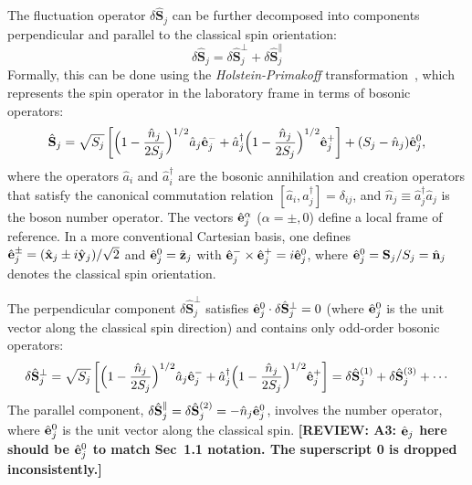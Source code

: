 \documentclass[aps, prx, nofootinbib, superscriptaddress]{revtex4-2}
\newcommand{\REVIEW}[1]{{\color{reviewcolor}\bfseries [REVIEW: #1]}}
\begin{document}
The fluctuation operator $\delta \hat{\mathbf{S}}_{j}$ can be further decomposed into components perpendicular and parallel to the classical spin orientation:
\begin{equation}
    \delta \hat{\mathbf{S}}_{j} = \delta \hat{\mathbf{S}}_{j}^{\perp} + \delta \hat{\mathbf{S}}_{j}^{\parallel} 
\end{equation}
Formally, this can be done using the \emph{Holstein-Primakoff} transformation~\cite{PhysRev.58.1098}, which represents the spin operator in the laboratory frame in terms of bosonic operators:
\begin{equation}
    \hat{\bf S}_{j} 
    = \sqrt{S_{j}} 
    \left[ 
    \Big( 1 - \frac{\hat{n}_{j}}{2S_{j}} \Big)^{1/2} \hat{a}_{j} \hat{\bf e}_{j}^{-} + 
    \hat{a}_{j}^{\dagger} \Big( 1 - \frac{\hat{n}_{j}}{2S_{j}} \Big)^{1/2} \hat{\bf e}_{j}^{+}
    \right]
    + (S_{j} - \hat{n}_{j}) \hat{\bf e}_{j}^{0},
\end{equation}
where the operators $\hat{a}_{i}$ and $\hat{a}_{i}^{\dagger}$ are the bosonic annihilation and creation operators that satisfy the canonical commutation relation $[\hat{a}_{i}, \hat{a}_{j}^{\dagger}] = \delta_{ij}$, and $\hat{n}_{j} \equiv \hat{a}^{\dagger}_{j} \hat{a}_{j}$ is the boson number operator. 
The vectors $\hat{\bf e}_{j}^{\alpha}$ ($\alpha = \pm, 0$) define a local frame of reference. In a more conventional Cartesian basis, one defines $\hat{\bf e}_{j}^{\pm} = (\hat{\bf x}_{j} \pm i \hat{\bf y}_{j})/\sqrt{2}$ and $\hat{\bf e}_{j}^{0} = \hat{\bf z}_{j}$ with $\hat{\bf e}_{j}^{-} \times \hat{\bf e}_{j}^{+} = i \hat{\bf e}_{j}^{0}$, where $\hat{\bf e}^{0}_{j} = {\bf S}_{j} / {S_{j}} = \hat{\bf n}_{j}$ denotes the classical spin orientation.

The perpendicular component $ \delta \hat{\mathbf{S}}_{j}^{\perp}$ satisfies $ \hat{\bf e}_{j}^{0} \cdot \delta \hat{\mathbf{S}}_{j}^{\perp} = 0 $ (where $\hat{\bf e}_{j}^{0}$ is the unit vector along the classical spin direction) and contains only odd-order bosonic operators: 
\begin{equation}
    \delta \hat{\mathbf{S}}_{j}^{\perp} = \sqrt{S_{j}}\left[ 
    \Big( 1 - \frac{\hat{n}_{j}}{2S_{j}} \Big)^{1/2} \hat{a}_{j} \hat{\bf e}_{j}^{-} + 
    \hat{a}_{j}^{\dagger} \Big( 1 - \frac{\hat{n}_{j}}{2S_{j}} \Big)^{1/2} \hat{\bf e}_{j}^{+}
    \right] 
    = \delta \hat{\mathbf{S}}_{j}^{(1)} + \delta \hat{\mathbf{S}}_{j}^{(3)} + \cdots 
\end{equation}
The parallel component, $\delta \hat{\mathbf{S}}_{j}^{\parallel} = \delta \hat{\mathbf{S}}_{j}^{(2)} = -\hat{n}_{j} \hat{\bf e}_{j}^{0}$, involves the number operator, where $\hat{\bf e}_{j}^{0}$ is the unit vector along the classical spin.
\REVIEW{A3: $\hat{\bf e}_{j}$ here should be $\hat{\bf e}_{j}^{0}$ to match Sec~1.1 notation. The superscript 0 is dropped inconsistently.}
\end{document}

